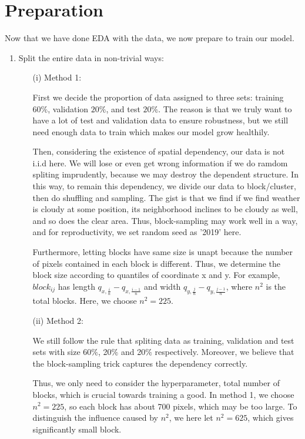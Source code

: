 \documentclass[11pt]{article}
\begin{document}
\section{Preparation}
Now that we have done EDA with the data, we now prepare to train our model.
\begin{enumerate}[label=(\alph*)]
\item Split the entire data in non-trivial ways:


\begin{enumerate}

\item[(i)] Method 1:

\quad First we decide the proportion of data assigned to three sets: training $60\%$, validation $20\%$, and test $20\%$. The reason is that we truly want to have a lot of test and validation data to ensure robustness, but we still need enough data to train which makes our model grow healthily.\par
\quad Then, considering the existence of spatial dependency, our data is not i.i.d here. We will lose or even get wrong information if we do ramdom spliting imprudently, because we may destroy the dependent structure. In this way, to remain this dependency, we divide our data to block/cluster, then do shuffling and sampling. The gist is that we find if we find weather is cloudy at some position, its neighborhood inclines to be cloudy as well, and so does the clear area. Thus, block-sampling may work well in a way, and for reproductivity, we set random seed as '2019' here.\par
\quad Furthermore, letting blocks have same size is unapt because the number of pixels contained in each block is different. Thus, we determine the block size according to quantiles of coordinate x and y. For example, $block_{ij}$ has length $q_{x,\frac{i}{n}}-q_{x,\frac{i-1}{n}}$ and width $q_{y,\frac{j}{n}}-q_{y,\frac{j-1}{n}}$, where $n^2$ is the total blocks. Here, we choose $n^2=225$.

\item[(ii)] Method 2:

\quad We still follow the rule that spliting data as training, validation and test sets with size 60$\%$, 20$\%$ and 20$\%$ respectively. Moreover, we believe that the block-sampling trick captures the dependency correctly.\par
\quad Thus, we only need to consider the hyperparameter, total number of blocks, which is crucial towards training a good. In method 1, we choose $n^2=225$, so each block has about 700 pixels, which may be too large. To distinguish the influence caused by $n^2$, we here let $n^2=625$, which gives significantly small block.
\end{enumerate}


\end{enumerate}
\end{document}
